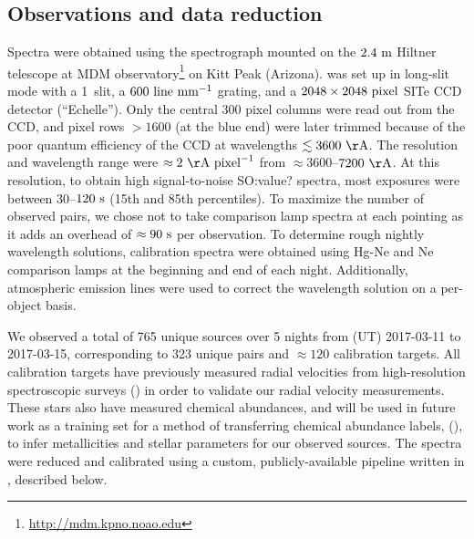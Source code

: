 \documentclass[modern, letterpaper]{aastex61}
\newcommand{\smoh}[1]{\textcolor{mediumpersianblue}{SO:#1}}
\begin{document}
\subsection{Observations and data reduction}\label{sec:reduction}

Spectra were obtained using the  spectrograph mounted on the
$2.4~{\rm m}$ Hiltner telescope at MDM
observatory\footnote{\url{http://mdm.kpno.noao.edu}} on Kitt Peak (Arizona).
 was set up in long-slit mode with a 1\arcsec\ slit, a
$600~{\rm line}~{\rm mm}^{-1}$ grating, and a $2048\times2048~{\rm pixel}$ SITe
CCD detector (``Echelle'').
Only the central 300 pixel columns were read out from the CCD, and pixel rows
$>1600$ (at the blue end) were later trimmed because of the poor quantum
efficiency of the CCD at wavelengths $\lesssim 3600~{\rm \AA}$.
The resolution and wavelength range were $\approx2~{\rm \AA}~{\rm pixel}^{-1}$
from $\approx 3600$--$7200~{\rm \AA}$.
At this resolution, to obtain high signal-to-noise \smoh{value?} spectra, most exposures were
between $30$--$120~{\rm s}$ (15th and 85th percentiles).
To maximize the number of observed pairs, we chose not to take
comparison lamp spectra at each pointing as it adds an overhead of $\approx
90~{\rm s}$ per observation.
To determine rough nightly wavelength solutions, calibration spectra were
obtained using Hg-Ne and Ne comparison lamps at the beginning and end of each
night.
Additionally, atmospheric emission lines were used to correct the wavelength
solution on a per-object basis.

We observed a total of 765 unique sources over 5 nights from (UT) 2017-03-11 to
2017-03-15, corresponding to 323 unique pairs and $\approx 120$
calibration targets.
All calibration targets have previously measured radial velocities from
high-resolution spectroscopic surveys (\citealt{Bensby:2014,Pinsonneault:2014})
in order to validate our radial velocity measurements.
These stars also have measured chemical abundances, and will be used in future
work as a training set for a method of transferring chemical abundance labels,
 (\citealt{Ness:2015}), to infer
metallicities and stellar parameters for our observed sources.
The spectra were reduced and calibrated using a custom, publicly-available
pipeline written in \python, described below.
\end{document}
